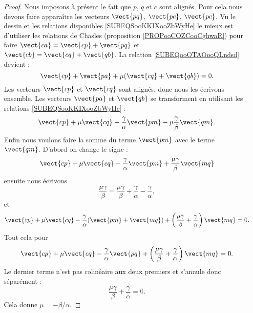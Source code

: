 \begin{proof}
    Nous imposons à présent le fait que \( p\), \( q\) et \( c \) sont alignés. Pour cela nous devons faire apparaître les vecteurs \( \vect{ pq }\), \( \vect{ pc }\), \( \vect{ pc }\). Vu le dessin et les relations disponibles \eqref{SUBEQSooKKIXooZbWyHe} le mieux est d'utiliser les relations de Chasles  (proposition \ref{PROPooCOZCooCghwaR}) pour faire \( \vect{ ca }=\vect{ cp }+\vect{ pq }\) et \( \vect{ cb }=\vect{ cq }+\vect{ qb }\).  La relation \eqref{SUBEQooOTAOooQLndsd} devient :
    \begin{equation}
        \vect{ cp }+\vect{ pa }+\mu(\vect{ cq }+\vect{ qb })=0.
    \end{equation}
    Les vecteurs \( \vect{ cp }\) et \( \vect{ cq }\) sont alignés, donc nous les écrivons ensemble. Les vecteurs \( \vect{ pa }\) et \( \vect{ qb }\) se transforment en utilisant les relations \eqref{SUBEQSooKKIXooZbWyHe} :
    \begin{equation}
        \vect{ cp }+\mu\vect{ cq }-\frac{ \gamma }{ \alpha }\vect{ pm }-\mu\frac{ \gamma }{ \beta }\vect{ qm }.
    \end{equation}
    Enfin nous voulons faire la somme du terme \( \vect{ pm }\) avec le terme \( \vect{ qm }\). D'abord on change le signe :
    \begin{equation}
        \vect{ cp }+\mu\vect{ cq }-\frac{ \gamma }{ \alpha }\vect{ pm }+\frac{ \mu\gamma }{ \beta }\vect{ mq }
    \end{equation}
    ensuite nous écrivons
    \begin{equation}
        \frac{ \mu\gamma }{ \beta }=\frac{ \mu\gamma }{ \beta }+\frac{ \gamma }{ \alpha }-\frac{ \gamma }{ \alpha },
    \end{equation}
    et
    \begin{equation}
        \vect{ cp }+\mu\vect{ cq }-\frac{ \gamma }{ \alpha }(\vect{ pm }+\vect{ mq })+\left( \frac{ \mu\gamma }{ \beta }+\frac{ \gamma }{ \alpha } \right)\vect{ mq }=0.
    \end{equation}
    Tout cela pour
    \begin{equation}
        \vect{ cp }+\mu\vect{ cq }-\frac{ \gamma }{ \alpha }\vect{ pq }+\left( \frac{ \mu\gamma }{ \beta }+\frac{ \gamma }{ \alpha } \right)\vect{ mq }=0.
    \end{equation}
    Le dernier terme n'est pas colinéaire aux deux premiers et s'annule donc séparément :
    \begin{equation}
        \frac{ \mu\gamma }{ \beta }+\frac{ \gamma }{ \alpha }=0.
    \end{equation}
    Cela donne \( \mu=-\beta/\alpha\).


\end{proof}
